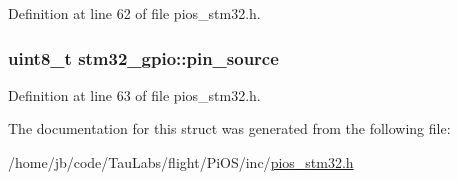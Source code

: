 \-Definition at line 62 of file pios\-\_\-stm32.\-h.

\hypertarget{structstm32__gpio_a79c5a3ec6b45fc1a2c4921c81f79ca42}{
\subsubsection[{pin\-\_\-source}]{\setlength{\rightskip}{0pt plus 5cm}uint8\-\_\-t {\bf stm32\-\_\-gpio\-::pin\-\_\-source}}}\label{structstm32__gpio_a79c5a3ec6b45fc1a2c4921c81f79ca42}


\-Definition at line 63 of file pios\-\_\-stm32.\-h.



\-The documentation for this struct was generated from the following file\-:\begin{DoxyCompactItemize}
\item 
/home/jb/code/\-Tau\-Labs/flight/\-Pi\-O\-S/inc/\hyperlink{pios__stm32_8h}{pios\-\_\-stm32.\-h}\end{DoxyCompactItemize}

